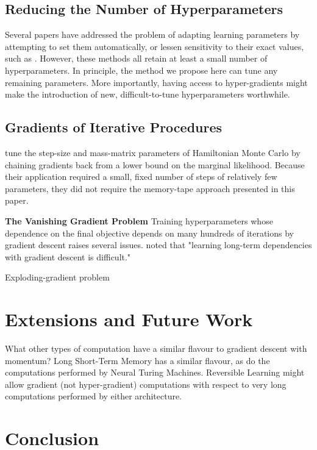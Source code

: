 \documentclass{article}
\begin{document}
\subsection{Reducing the Number of Hyperparameters}
Several papers have addressed the problem of adapting learning parameters by attempting to set them automatically, or lessen sensitivity to their exact values, such as \cite{schaul2012no, Adam14, Adasecant14, Hotswap14}.
However, these methods all retain at least a small number of hyperparameters.
In principle, the method we propose here can tune any remaining parameters.
More importantly, having access to hyper-gradients might make the introduction of new, difficult-to-tune hyperparameters worthwhile.

\subsection{Gradients of Iterative Procedures}

\citet{Bridging14} tune the step-size and mass-matrix parameters of Hamiltonian Monte Carlo by chaining gradients back from a lower bound on the marginal likelihood.
Because their application required a small, fixed number of steps of relatively few parameters, they did not require the memory-tape approach presented in this paper.

\textbf{The Vanishing Gradient Problem}
Training hyperparameters whose dependence on the final objective depends on many hundreds of iterations by gradient descent raises several issues.
\citet{bengio1994learning} noted that "learning long-term dependencies with gradient descent is difficult."

Exploding-gradient problem~\cite{pascanu2012understanding}

\section{Extensions and Future Work}

What other types of computation have a similar flavour to gradient descent with momentum?
Long Short-Term Memory has a similar flavour, as do the computations performed by Neural Turing Machines.
Reversible Learning might allow gradient (not hyper-gradient) computations with respect to very long computations performed by either architecture.

\section{Conclusion}
\end{document}
